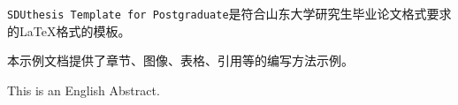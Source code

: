 \begin{cnabstract}

\verb|SDUthesis Template for Postgraduate|是符合山东大学研究生毕业论文格式要求的\LaTeX{}格式的模板。

本示例文档提供了章节、图像、表格、引用等的编写方法示例。


\end{cnabstract}

\begin{enabstract}

This is an English Abstract.


\end{enabstract}
